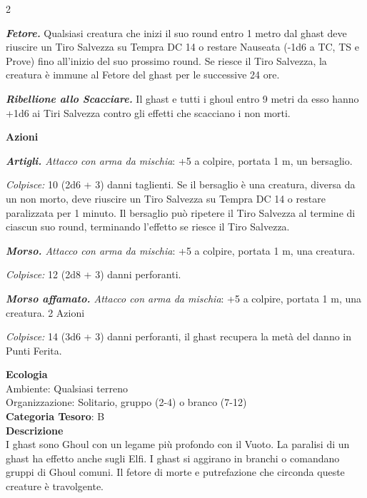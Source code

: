 \begin{multicols}{2}
{\emph{\textbf{Fetore.}} Qualsiasi creatura che inizi il suo round entro 1 metro dal ghast deve riuscire un Tiro Salvezza su Tempra DC 14 o restare Nauseata (-1d6 a TC, TS e Prove) fino all'inizio del suo prossimo round. Se riesce il Tiro Salvezza, la creatura è immune al Fetore del ghast per le successive 24 ore.

\emph{\textbf{Ribellione allo Scacciare.}} Il ghast e tutti i ghoul entro 9 metri da esso hanno +1d6 ai Tiri Salvezza contro gli effetti che scacciano i non morti.

\textbf{Azioni}

\emph{\textbf{Artigli.} Attacco con arma da mischia}: +5 a colpire, portata 1 m, un bersaglio.

\emph{Colpisce:} 10 (2d6 + 3) danni taglienti. Se il bersaglio è una creatura, diversa da un non morto, deve riuscire un Tiro Salvezza su Tempra DC 14 o restare paralizzata per 1 minuto. Il bersaglio può ripetere il Tiro Salvezza al termine di ciascun suo round, terminando l'effetto se riesce il Tiro Salvezza.

\emph{\textbf{Morso.} Attacco con arma da mischia}: +5 a colpire, portata 1 m, una creatura.

\emph{Colpisce:} 12 (2d8 + 3) danni perforanti.

\emph{\textbf{Morso affamato.} Attacco con arma da mischia}: +5 a colpire, portata 1 m, una creatura. 2 Azioni

\emph{Colpisce:} 14 (3d6 + 3) danni perforanti, il ghast recupera la metà del danno in Punti Ferita.

\textbf{Ecologia}\\
Ambiente: Qualsiasi terreno\\
Organizzazione: Solitario, gruppo (2-4) o branco (7-12)\\
\textbf{Categoria Tesoro}: B\\
\textbf{Descrizione}\\
I ghast sono Ghoul con un legame più profondo con il Vuoto. La paralisi di un ghast ha effetto anche sugli Elfi. I ghast si aggirano in branchi o comandano gruppi di Ghoul comuni. Il fetore di morte e putrefazione che circonda queste creature è travolgente.

}
\end{multicols}
